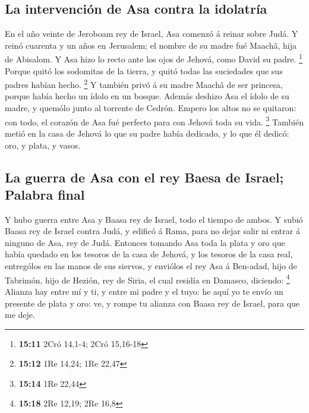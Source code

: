 \hypertarget{la-intervenciuxf3n-de-asa-contra-la-idolatruxeda}{%
\subsection{La intervención de Asa contra la
idolatría}\label{la-intervenciuxf3n-de-asa-contra-la-idolatruxeda}}

 En el año veinte de Jeroboam rey de Israel, Asa comenzó á
reinar sobre Judá.  Y reinó cuarenta y un años en
Jerusalem; el nombre de su madre fué Maachâ, hija de Abisalom.
 Y Asa hizo lo recto ante los ojos de Jehová, como David
su padre. \footnote{\textbf{15:11} 2Cró 14,1-4; 2Cró 15,16-18}
 Porque quitó los sodomitas de la tierra, y quitó todas
las suciedades que sus padres habían hecho. \footnote{\textbf{15:12} 1Re
  14,24; 1Re 22,47}  Y también privó á su madre Maachâ de
ser princesa, porque había hecho un ídolo en un bosque. Además deshizo
Asa el ídolo de su madre, y quemólo junto al torrente de Cedrón.
 Empero los altos no se quitaron: con todo, el corazón de
Asa fué perfecto para con Jehová toda su vida. \footnote{\textbf{15:14}
  1Re 22,44}  También metió en la casa de Jehová lo que
su padre había dedicado, y lo que él dedicó: oro, y plata, y vasos.

\hypertarget{la-guerra-de-asa-con-el-rey-baesa-de-israel-palabra-final}{%
\subsection{La guerra de Asa con el rey Baesa de Israel; Palabra
final}\label{la-guerra-de-asa-con-el-rey-baesa-de-israel-palabra-final}}

 Y hubo guerra entre Asa y Baasa rey de Israel, todo el
tiempo de ambos.  Y subió Baasa rey de Israel contra
Judá, y edificó á Rama, para no dejar salir ni entrar á ninguno de Asa,
rey de Judá.  Entonces tomando Asa toda la plata y oro
que había quedado en los tesoros de la casa de Jehová, y los tesoros de
la casa real, entrególos en las manos de sus siervos, y enviólos el rey
Asa á Ben-adad, hijo de Tabrimón, hijo de Hezión, rey de Siria, el cual
residía en Damasco, diciendo: \footnote{\textbf{15:18} 2Re 12,19; 2Re
  16,8}  Alianza hay entre mí y ti, y entre mi padre y el
tuyo: he aquí yo te envío un presente de plata y oro: ve, y rompe tu
alianza con Baasa rey de Israel, para que me deje.

